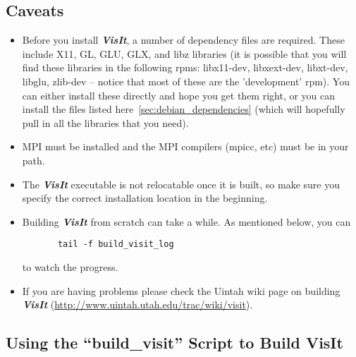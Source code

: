 \documentclass[11pt,fleqn]{book} %
\begin{document}
\subsection{Caveats}
\label{subsec:VisIt_Caveats}
\begin{itemize}
\item Before you install \textbf{\emph{VisIt}}, a number of dependency
  files are required.  These include X11, GL, GLU, GLX, and libz
  libraries (it is possible that you will find these libraries in the
  following rpms: libx11-dev, libxext-dev, libxt-dev, libglu, zlib-dev
  -- notice that most of these are the 'development' rpm).  You can
  either install these directly and hope you get them right, or you
  can install the files listed here~\ref{sec:debian_dependencies}
  (which will hopefully pull in all the libraries that you need).
\item MPI must be installed and the MPI compilers (mpicc, etc) must be
  in your path.
\item The \textbf{\emph{VisIt}} executable is not relocatable once it
  is built, so make sure you specify the correct installation location
  in the beginning.
\item Building \textbf{\emph{VisIt}} from scratch can take a while.
  As mentioned below, you can 
    \begin{lstlisting}
       tail -f build_visit_log
    \end{lstlisting} 
    to watch the progress.
\item If you are having problems please check the Uintah wiki page on
  building \textbf{\emph{VisIt}}
  (\url{http://www.uintah.utah.edu/trac/wiki/visit}).

\end{itemize}



\subsection{Using the ``build\_visit'' Script to Build VisIt}
\label{subsec:VisItVersion2_tarball}
\end{document}

